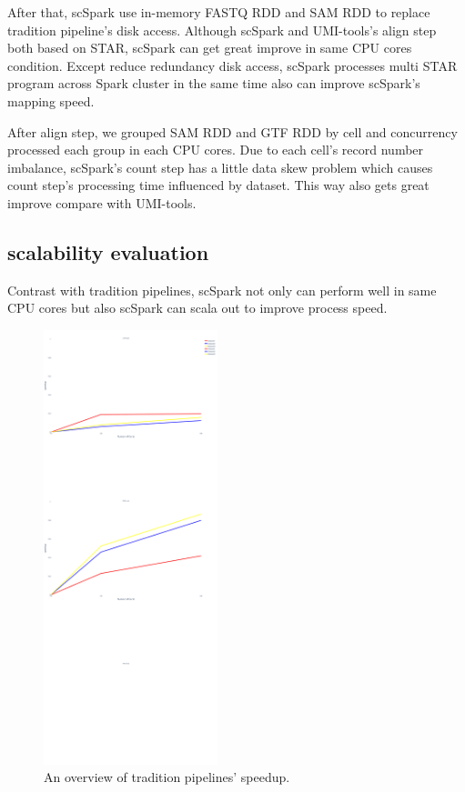 \documentclass[conference]{IEEEtran}
\begin{document}
After that, scSpark use in-memory FASTQ RDD and SAM RDD to replace tradition pipeline's disk access. 
Although scSpark and UMI-tools's align step both based on STAR, scSpark can get great improve in same CPU cores condition.
Except reduce redundancy disk access, scSpark processes multi STAR program across Spark cluster in the same time also can improve scSpark's mapping speed.

After align step, we grouped SAM RDD and GTF RDD by cell and concurrency processed each group in each CPU cores.
Due to each cell's record number imbalance, scSpark's count step has a little data skew problem which causes count step's processing time influenced by dataset.
This way also gets great improve compare with UMI-tools.
\fi

\subsection{scalability evaluation} 
Contrast with tradition pipelines, scSpark not only can perform well in same CPU cores but also scSpark can scala out to improve process speed.
\begin{figure}
	\includegraphics[width=0.45\textwidth]{Fig5.pdf}
	\caption{An overview of tradition pipelines' speedup.} \label{fig5}
\end{figure}
\end{document}
